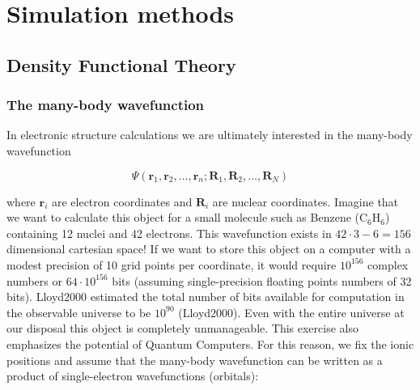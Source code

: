 \newcommand{\jp}{j^\prime}
\newcommand{\jpp}{j^{\prime\prime}}
\newcommand{\lp}{l^\prime}
\newcommand{\lpp}{l^{\prime\prime}}
\newcommand{\fc}{\bm{\Phi}\genfrac{(}{)}{0pt}{}{j \jp}{l \lp}}
\newcommand{\fczero}{\bm{\Phi}\genfrac{(}{)}{0pt}{}{j \jp}{0 \lp}}
\newcommand{\fcb}{\bm{\Theta}\genfrac{(}{)}{0pt}{}{j \jp}{l \lp}}
\newcommand{\fcbpp}{\bm{\Theta}\genfrac{(}{)}{0pt}{}{j \jpp}{l \lpp}}
\newcommand{\fcbf}{-\bm{\Theta}\genfrac{(}{)}{0pt}{}{j \jp}{l \lp} + \delta_{j,\jp} \delta_{l,\lp} \sum_{\jpp, \lpp}  \bm{\Theta}\genfrac{(}{)}{0pt}{}{j \jpp}{l \lpp} }
\newcommand*\tageq{\refstepcounter{equation}\tag{\theequation}}

\chapter{Simulation methods}

\section{Density Functional Theory}\label{sec:dft}

\subsection{The many-body wavefunction}
In electronic structure calculations we are ultimately interested in the many-body wavefunction

\[ \Psi(\bm{r}_1,\bm{r}_2,\dots, \bm{r}_n; \bm{R}_1, \bm{R}_2, \dots , \bm{R}_N) \]

\noindent where $\bm{r}_i$ are electron coordinates and $\bm{R}_i$ are nuclear coordinates. Imagine that we want to calculate this object for a small molecule such as Benzene (C$_6$H$_6$) containing 12 nuclei and 42 electrons. This wavefunction exists in $42\cdot3-6 = 156$ dimensional cartesian space! If we want to store this object on a computer with a modest precision of 10 grid points per coordinate, it would require $10^{156}$ complex numbers or $64 \cdot 10^{156}$ bits (assuming single-precision floating points numbers of 32 bits). Lloyd2000 estimated the total number of bits available for computation in the observable universe to be $10^{90}$ (Lloyd2000). Even with the entire universe at our disposal this object is completely unmanageable. This exercise also emphasizes the potential of Quantum Computers. For this reason, we fix the ionic positions and assume that the many-body wavefunction can be written as a product of single-electron wavefunctions (orbitals):


